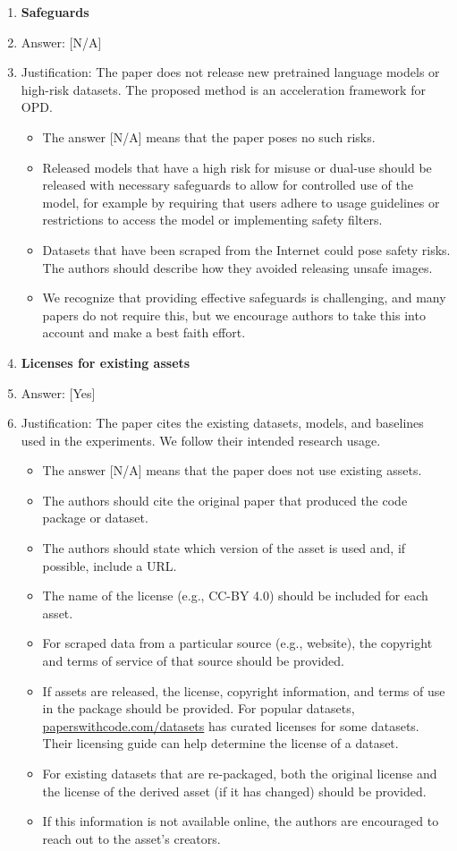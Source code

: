 \documentclass{llmxive}
\providecommand{\answerYes}[1][]{[Yes]#1}
\providecommand{\answerNA}[1][]{[N/A]#1}
\begin{document}
\begin{enumerate}
\item {\bf Safeguards}
    \item[] Answer: \answerNA{}
    \item[] Justification: The paper does not release new pretrained language models or high-risk datasets. The proposed method is an acceleration framework for OPD.
    \begin{itemize}
        \item The answer \answerNA{} means that the paper poses no such risks.
        \item Released models that have a high risk for misuse or dual-use should be released with necessary safeguards to allow for controlled use of the model, for example by requiring that users adhere to usage guidelines or restrictions to access the model or implementing safety filters. 
        \item Datasets that have been scraped from the Internet could pose safety risks. The authors should describe how they avoided releasing unsafe images.
        \item We recognize that providing effective safeguards is challenging, and many papers do not require this, but we encourage authors to take this into account and make a best faith effort.
    \end{itemize}

\item {\bf Licenses for existing assets}
    \item[] Answer: \answerYes{}
    \item[] Justification: The paper cites the existing datasets, models, and baselines used in the experiments. We follow their intended research usage.
    \begin{itemize}
        \item The answer \answerNA{} means that the paper does not use existing assets.
        \item The authors should cite the original paper that produced the code package or dataset.
        \item The authors should state which version of the asset is used and, if possible, include a URL.
        \item The name of the license (e.g., CC-BY 4.0) should be included for each asset.
        \item For scraped data from a particular source (e.g., website), the copyright and terms of service of that source should be provided.
        \item If assets are released, the license, copyright information, and terms of use in the package should be provided. For popular datasets, \url{paperswithcode.com/datasets} has curated licenses for some datasets. Their licensing guide can help determine the license of a dataset.
        \item For existing datasets that are re-packaged, both the original license and the license of the derived asset (if it has changed) should be provided.
        \item If this information is not available online, the authors are encouraged to reach out to the asset's creators.
    \end{itemize}


\end{enumerate}
\end{document}

